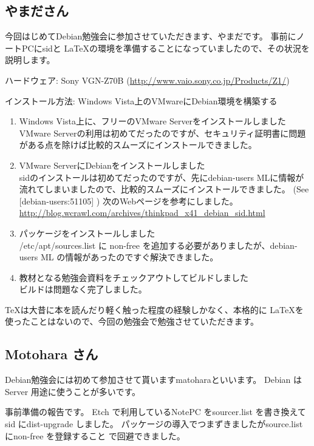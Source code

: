 \documentclass[mingoth,a4paper]{jsarticle}
\begin{document}
\subsection{やまださん}
今回はじめてDebian勉強会に参加させていただきます、やまだです。
事前にノートPCにsidと \LaTeX の環境を準備することになっていましたので、その状況を説明します。

ハードウェア: Sony VGN-Z70B (\url{http://www.vaio.sony.co.jp/Products/Z1/})

インストール方法: Windows Vista上のVMwareにDebian環境を構築する

\begin{enumerate}
\item Windows Vista上に、フリーのVMware Serverをインストールしました\\
VMware Serverの利用は初めてだったのですが、セキュリティ証明書に問題がある点を除けば比較的スムーズにインストールできました。

\item VMware ServerにDebianをインストールしました\\
sidのインストールは初めてだったのですが、先にdebian-users
MLに情報が流れてしまいましたので、比較的スムーズにインストールできました。 (See [debian-users:51105] )
次のWebページを参考にしました。 \url{http://blog.wcrawl.com/archives/thinkpad_x41_debian_sid.html}

\item パッケージをインストールしました\\
/etc/apt/sources.list に non-free を追加する必要がありましたが、debian-users ML
の情報があったのですぐ解決できました。

\item 教材となる勉強会資料をチェックアウトしてビルドしました\\
ビルドは問題なく完了しました。
\end{enumerate}
\TeX は大昔に本を読んだり軽く触った程度の経験しかなく、本格的に \LaTeX を使ったことはないので、今回の勉強会で勉強させていただきます。


\subsection{Motohara さん}
Debian勉強会には初めて参加させて貰いますmatoharaといいます。
Debian はServer 用途に使うことが多いです。

事前準備の報告です。
Etch で利用しているNotePC をsourcer.list を書き換えてsid にdist-upgrade
しました。
パッケージの導入でつまずきましたがsource.list にnon-free を登録すること
で回避できました。
\end{document}
